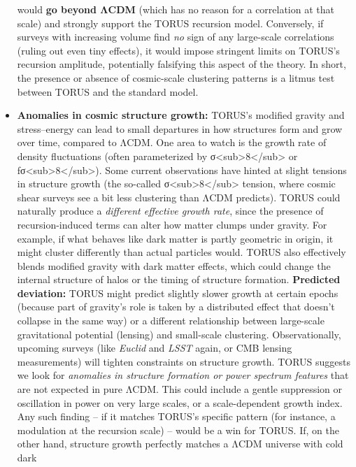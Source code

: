\documentclass[]{article}
\begin{document}
\begin{itemize}
  would \textbf{go beyond ΛCDM} (which has no reason for a correlation
  at that scale) and strongly support the TORUS recursion model.
  Conversely, if surveys with increasing volume find \emph{no} sign of
  any large-scale correlations (ruling out even tiny effects), it would
  impose stringent limits on TORUS's recursion amplitude, potentially
  falsifying this aspect of the theory​. In short, the presence or
  absence of cosmic-scale clustering patterns is a litmus test between
  TORUS and the standard model.
\item
  \textbf{Anomalies in cosmic structure growth:} TORUS's modified
  gravity and stress--energy can lead to small departures in how
  structures form and grow over time, compared to ΛCDM. One area to
  watch is the growth rate of density fluctuations (often parameterized
  by σ\textless{}sub\textgreater{}8\textless{}/sub\textgreater{} or
  fσ\textless{}sub\textgreater{}8\textless{}/sub\textgreater{}). Some
  current observations have hinted at slight tensions in structure
  growth (the so-called
  σ\textless{}sub\textgreater{}8\textless{}/sub\textgreater{} tension,
  where cosmic shear surveys see a bit less clustering than ΛCDM
  predicts). TORUS could naturally produce a \emph{different effective
  growth rate}, since the presence of recursion-induced terms can alter
  how matter clumps under gravity. For example, if what behaves like
  dark matter is partly geometric in origin, it might cluster
  differently than actual particles would. TORUS also effectively blends
  modified gravity with dark matter effects, which could change the
  internal structure of halos or the timing of structure formation.
  \textbf{Predicted deviation:} TORUS might predict slightly slower
  growth at certain epochs (because part of gravity's role is taken by a
  distributed effect that doesn't collapse in the same way) or a
  different relationship between large-scale gravitational potential
  (lensing) and small-scale clustering. Observationally, upcoming
  surveys (like \emph{Euclid} and \emph{LSST} again, or CMB lensing
  measurements) will tighten constraints on structure growth. TORUS
  suggests we look for \emph{anomalies in structure formation or power
  spectrum features} that are not expected in pure ΛCDM​. This could
  include a gentle suppression or oscillation in power on very large
  scales, or a scale-dependent growth index. Any such finding -- if it
  matches TORUS's specific pattern (for instance, a modulation at the
  recursion scale) -- would be a win for TORUS. If, on the other hand,
  structure growth perfectly matches a ΛCDM universe with cold dark

\end{itemize}
\end{document}
